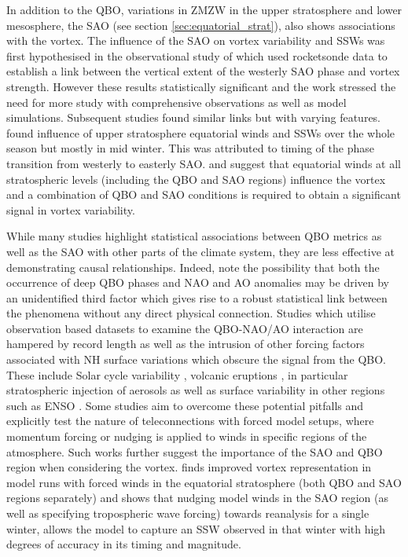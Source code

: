 In addition to the QBO, variations in ZMZW in the upper stratosphere and lower mesosphere, the SAO (see section \ref{sec:equatorial_strat}), also shows associations with the vortex. The influence of the SAO on vortex variability and SSWs was first hypothesised in the observational study of \cite{grayData2001} which used rocketsonde data to establish a link between the vertical extent of the westerly SAO phase and vortex strength. However these results statistically significant and the work stressed the need for more study with comprehensive observations as well as model simulations. Subsequent studies found similar links but with varying features. \cite{grayinfluence2003} found influence of upper stratosphere equatorial winds and SSWs over the whole season but mostly in mid winter. This was attributed to timing of the phase transition from westerly to easterly SAO. \cite{grayData2001} and \cite{hamiltonEffects1998} suggest that equatorial winds at all stratospheric levels (including the QBO and SAO regions) influence the vortex and a combination of QBO and SAO conditions is required to obtain a significant signal in vortex variability.

While many studies highlight statistical associations between QBO metrics as well as the SAO with other parts of the climate system, they are less effective at demonstrating causal relationships. Indeed, \cite{andrewsObserved2019d} note the possibility that both the occurrence of deep QBO phases and NAO and AO anomalies may be driven by an unidentified third factor which gives rise to a robust statistical link between the phenomena without any direct physical connection. Studies which utilise observation based datasets to examine the QBO-NAO/AO interaction are hampered by record length as well as the intrusion of other forcing factors associated with NH surface variations which obscure the signal from the QBO. These include Solar cycle variability \citep{GrayElevenyear2016}, volcanic eruptions \citep{stenchikovArctic2004}, in particular stratospheric injection of aerosols as well as surface variability in other regions such as ENSO \citep{bellStratospheric2009}. Some studies aim to overcome these potential pitfalls and explicitly test the nature of teleconnections with forced model setups, where momentum forcing or nudging is applied to winds in specific regions of the atmosphere. Such works further suggest the importance of the SAO and QBO region when considering the vortex. \cite{pascoeQuasibiennial2005b} finds improved vortex representation in model runs with forced winds in the equatorial stratosphere (both QBO and SAO regions separately) and \cite{grayForecasting2020} shows that nudging model winds in the SAO region (as well as specifying tropospheric wave forcing) towards reanalysis for a single winter, allows the model to capture an SSW observed in that winter with high degrees of accuracy in its timing and magnitude.   

